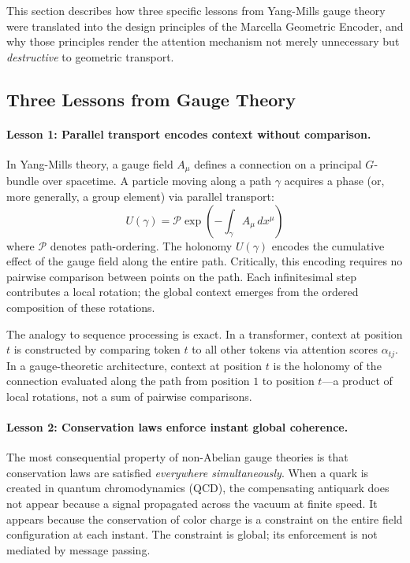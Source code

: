 \documentclass[11pt,a4paper]{article}
\theoremstyle{definition}
\theoremstyle{remark}
\begin{document}
This section describes how three specific lessons from Yang-Mills 
gauge theory were translated into the design principles of the 
Marcella Geometric Encoder, and why those principles render the 
attention mechanism not merely unnecessary but \emph{destructive} 
to geometric transport.

\subsection{Three Lessons from Gauge Theory}
\label{subsec:three-lessons}

\paragraph{Lesson 1: Parallel transport encodes context without comparison.}
In Yang-Mills theory, a gauge field $A_\mu$ defines a connection 
on a principal $G$-bundle over spacetime. A particle moving along 
a path $\gamma$ acquires a phase (or, more generally, a group 
element) via parallel transport:
\begin{equation}
    U(\gamma) = \mathcal{P} \exp\!\left(-\int_\gamma A_\mu \, dx^\mu\right)
\label{eq:wilson-line}
\end{equation}
where $\mathcal{P}$ denotes path-ordering. The holonomy $U(\gamma)$ 
encodes the cumulative effect of the gauge field along the entire 
path. Critically, this encoding requires no pairwise comparison 
between points on the path. Each infinitesimal step contributes a 
local rotation; the global context emerges from the ordered 
composition of these rotations.

The analogy to sequence processing is exact. In a transformer, 
context at position $t$ is constructed by comparing token $t$ to 
all other tokens via attention scores $\alpha_{tj}$. In a 
gauge-theoretic architecture, context at position $t$ is the 
holonomy of the connection evaluated along the path from position 
$1$ to position $t$---a product of local rotations, not a sum of 
pairwise comparisons.

\paragraph{Lesson 2: Conservation laws enforce instant global coherence.}
The most consequential property of non-Abelian gauge theories is 
that conservation laws are satisfied \emph{everywhere simultaneously}. 
When a quark is created in quantum chromodynamics (QCD), the 
compensating antiquark does not appear because a signal propagated 
across the vacuum at finite speed. It appears because the 
conservation of color charge is a constraint on the entire field 
configuration at each instant. The constraint is global; its 
enforcement is not mediated by message passing.
\end{document}
